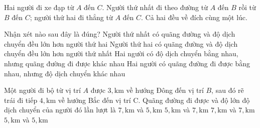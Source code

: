 \begin{ex}
Hai người đi xe đạp từ $A$ đến $C$. Người thứ nhất đi theo đường từ $A$ đến $B$ rồi từ $B$ đến $C$; người thứ hai đi thẳng từ $A$ đến $C$. Cả hai đều về đích cùng một lúc.

Nhận xét nào sau đây là đúng?
\choice
{Người thứ nhất có quãng đường và độ dịch chuyển đều lớn hơn người thứ hai}
{Người thứ hai có quãng đường và độ dịch chuyển đều lớn hơn người thứ nhất}
{\True Hai người có độ dịch chuyển bằng nhau, nhưng quãng đường đi được khác nhau}
{Hai người có quãng đường đi được bằng nhau, nhưng độ dịch chuyển khác nhau}
\end{ex}

\begin{ex}
Một người đi bộ từ vị trí $A$ được $3,\mathrm{km}$ về hướng Đông đến vị trí $B$, sau đó rẽ trái đi tiếp $4,\mathrm{km}$ về hướng Bắc đến vị trí C. Quãng đường đi được và độ lớn độ dịch chuyển của người đó lần lượt là
\choice
{\True $7,\mathrm{km}$ và $5,\mathrm{km}$}
{$5,\mathrm{km}$ và $7,\mathrm{km}$}
{$7,\mathrm{km}$ và $7,\mathrm{km}$}
{$5,\mathrm{km}$ và $5,\mathrm{km}$}
\end{ex}

